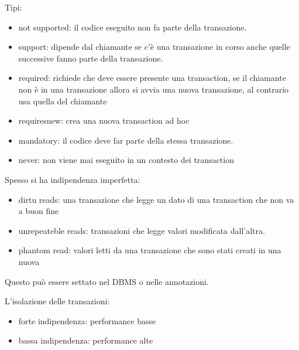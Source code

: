 Tipi:
\begin{itemize}
    \item not supported: il codice eseguito non fa parte della transazione.
    \item support: dipende dal chiamante se c'è una transazione in corso anche quelle
    successive fanno parte della transazione.
    \item required: richiede che deve essere presente una transaction, se il chiamante
    non è in una transazione allora si avvia una nuova transazione, al contrario usa 
    quella del chiamante
    \item requiresnew: crea una nuova transaction ad hoc
    \item mandatory: il codice deve far parte della stessa transazione.
    \item never: non viene mai eseguito in un contesto dei transaction
\end{itemize}

Spesso si ha indipendenza imperfetta:
\begin{itemize}
    \item dirtu reads: una transazione che legge un dato di una transaction che non 
    va a buon fine
    \item unrepeateble reads: transazioni che legge valori modificata dall'altra.
    \item phantom read: valori letti da una transazione che sono stati creati in una nuova 
\end{itemize}
Questo può essere settato nel DBMS o nelle annotazioni.

L'isolazione delle transazioni:
\begin{itemize}
    \item forte indipendenza: performance basse
    \item bassa indipendenza: performance alte 
\end{itemize}